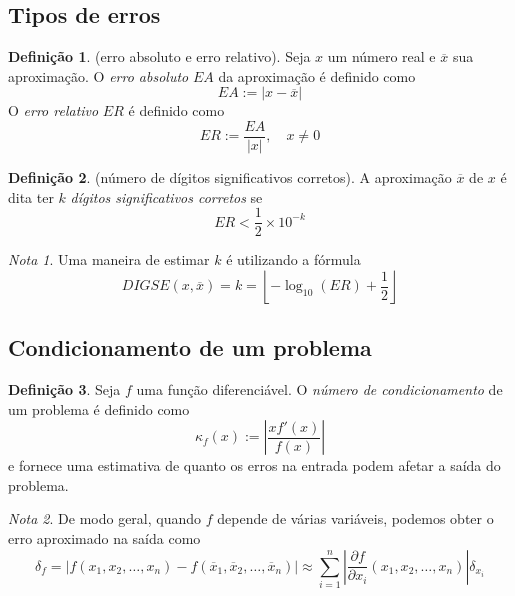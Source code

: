\documentclass[12pt]{article}
\theoremstyle{plain}
\theoremstyle{definition}
\newtheorem{defn}{Definição}[section]
\theoremstyle{remark}
\newtheorem*{rem}{Nota}
\begin{document}
\subsection{Tipos de erros}

\begin{defn} (erro absoluto e erro relativo).
    Seja \(x\) um número real e \(\overline{x}\) sua aproximação. O \emph{erro absoluto} \(EA\) da aproximação é definido como
    \begin{equation}
        EA := \vert x - \overline{x} \vert
    \end{equation}
    O \emph{erro relativo} \(ER\) é definido como
    \begin{equation}
        ER := \frac{EA}{\vert x \vert}, \quad x \neq 0
    \end{equation}
\end{defn}

\begin{defn} (número de dígitos significativos corretos).
    A aproximação \(\overline{x}\) de \(x\) é dita ter \(k\) \emph{dígitos significativos corretos} se
    \begin{equation}
        ER < \frac{1}{2} \times 10^{-k}
    \end{equation}
\end{defn}

\begin{rem}
    Uma maneira de estimar \(k\) é utilizando a fórmula
    \begin{equation}
        DIGSE(x, \overline{x}) = k = \left\lfloor -\log_{10}(ER) + \frac{1}{2} \right\rfloor
    \end{equation}
\end{rem}

\subsection{Condicionamento de um problema}

\begin{defn}
    Seja \(f\) uma função diferenciável. O \emph{número de condicionamento} de um problema é definido como
    \begin{equation}
        \kappa_f(x) := \left\vert \frac{xf'(x)}{f(x)} \right\vert
    \end{equation}
    \noindent e fornece uma estimativa de quanto os erros na entrada podem afetar a saída do problema.
\end{defn}

\begin{rem}
    De modo geral, quando \(f\) depende de várias variáveis, podemos obter o erro aproximado na saída como
    \begin{equation}
        \delta_f = \vert f(x_1, x_2, \ldots, x_n) - f(\overline{x}_1, \overline{x}_2, \ldots, \overline{x}_n) \vert \approx \sum_{i=1}^{n} \left\vert \frac{\partial f}{\partial x_i} (x_1, x_2, \ldots, x_n)\right\vert \delta_{x_i}
    \end{equation}
\end{rem}
\end{document}
